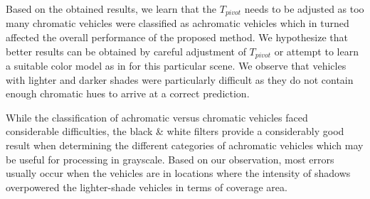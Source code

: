 Based on the obtained results, we learn that the $T_{pivot}$ needs to be adjusted as too many chromatic vehicles were classified as achromatic vehicles which in turned affected the overall performance of the proposed method. We hypothesize that better results can be obtained by careful adjustment of $T_{pivot}$ or attempt to learn a suitable color model as in \cite{hu2015vehicle,rachmadi2015vehicle} for this particular scene. We observe that vehicles with lighter and darker shades were particularly difficult as they do not contain enough chromatic hues to arrive at a correct prediction.  

While the classification of achromatic versus chromatic vehicles faced considerable difficulties, the black \& white filters provide a considerably good result when determining the different categories of achromatic vehicles which may be useful for processing in grayscale. Based on our observation, most errors usually occur when the vehicles are in locations where the intensity of shadows overpowered the lighter-shade vehicles in terms of coverage area. 

